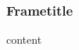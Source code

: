 \documentclass{ltx-talk}
\begin{document}
\begin{frame}
  \frametitle{Frametitle}
  content
\end{frame}
\end{document}
